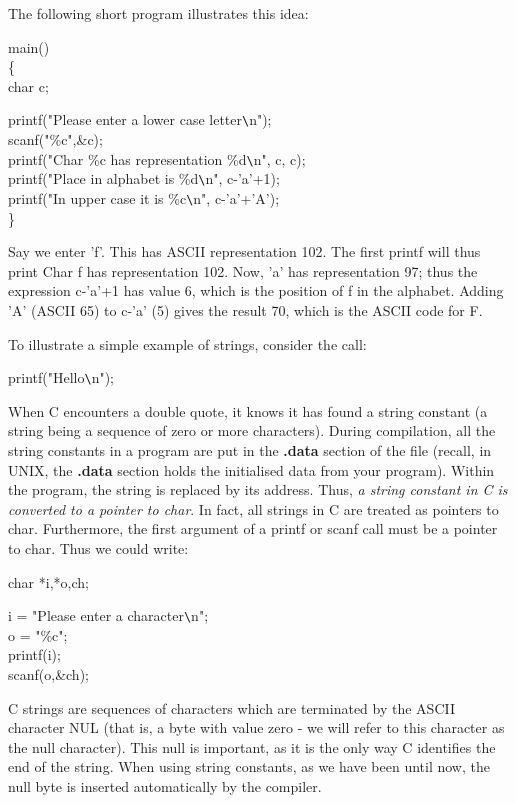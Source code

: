      The following short program illustrates this idea:
\begin{code}
 main()  \\
 \{ \+  \\
   char c; \addVspace

   printf("Please enter a lower case letter\verb+\+n"); \\
   scanf("\%c",\&c); \\
   printf("Char \%c has representation \%d\verb+\+n", c, c); \\
   printf("Place in alphabet is \%d\verb+\+n", c-'a'+1); \\
   printf("In upper case it is \%c\verb+\+n", c-'a'+'A'); 
	\-\\
\}
\end{code}
\noindent
     Say we  enter {\cd 'f'}.  This has ASCII representation 102\@.
The first {\cd printf} will thus print {\cd Char f has representation
102}. Now, {\cd 'a'} has representation 97; thus the expression {\cd
c-'a'+1}  has value 6, which is the position of {\cd f} in  the
alphabet.  Adding {\cd 'A'} (ASCII 65) to {\cd c-'a'} (5) gives the
result 70, which is the ASCII code for {\cd F}.

     To illustrate a simple example of {\kc strings}, consider the call:
\begin{code}
 printf("Hello\verb+\+n");
\end{code}
\noindent
     When C encounters a double quote, it knows it has found a {\kc
string constant\/} (a string  being a  sequence of  zero or more
characters). During compilation, all the string constants in a
program are put in the {\bf .data} section of the file (recall, in  UNIX,
the  {\bf .data} section  holds the  initialised data  from  your
program). Within  the program,  the string is replaced by its address.
Thus, {\em a string constant  in C  is converted to a pointer to
char}. In fact, all strings in C  are treated  as pointers  to char. 
Furthermore, the first argument of a {\cd printf} or {\cd scanf} call
must be a pointer to char. Thus we could write:
\begin{code}
 char *i,*o,ch; \addVspace

 i = "Please enter a character\verb+\+n"; \\
 o = "\%c"; \\
 printf(i); \\
 scanf(o,\&ch);
\end{code}
\noindent
     C strings  are sequences  of characters  which are terminated by
the ASCII character NUL (that is, a byte with value zero - we will
refer to this character as the null character).  This
null is important, as it is the only way  C identifies  the end of
the string. When using string constants, as we have  been until  now,
the  null  byte  is inserted  automatically  by  the compiler.

